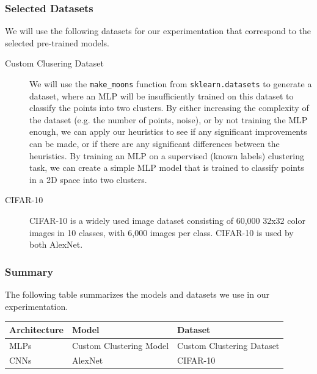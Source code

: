 \documentclass{article}
\begin{document}
\subsubsection{Selected Datasets}
We will use the following datasets for our experimentation that correspond to the selected pre-trained models.

\begin{description}
	\item[Custom Clusering Dataset] {
		We will use the \texttt{make\_moons} function from \texttt{sklearn.datasets} to generate a dataset, where an MLP will be insufficiently trained on this dataset to classify the points into two clusters.
		By either increasing the complexity of the dataset (e.g. the number of points, noise), or by not training the MLP enough, we can apply our heuristics to see if any significant improvements can be made, or if there are any significant differences between the heuristics.
		By training an MLP on a supervised (known labels) clustering task, we can create a simple MLP model that is trained to classify points in a 2D space into two clusters.
		}
	\item[CIFAR-10 \cite{cifar_10}] {
		CIFAR-10 is a widely used image dataset consisting of 60,000 32x32 color images in 10 classes, with 6,000 images per class.
		CIFAR-10 is used by both AlexNet.
		}
\end{description}

\subsubsection{Summary}

The following table summarizes the models and datasets we use in our experimentation.

\begin{longtable}{p{} p{} p{}}
	\toprule
	\textbf{Architecture} & \textbf{Model}          & \textbf{Dataset}          \\
	\midrule
	\endhead
	\bottomrule
	\endfoot
	\bottomrule
	\endlastfoot
	MLPs                  & Custom Clustering Model & Custom Clustering Dataset \\
	\midrule
	CNNs                  & AlexNet \cite{alexnet}  & CIFAR-10 \cite{cifar_10}  \\
\end{longtable}
\end{document}
